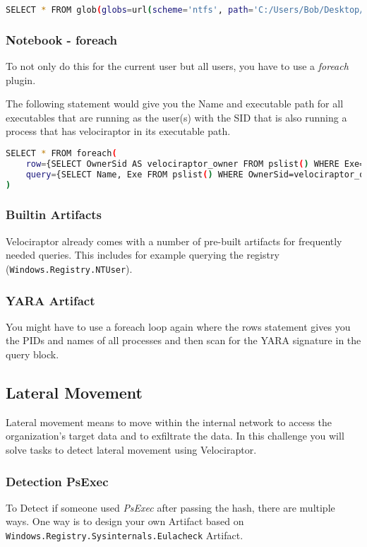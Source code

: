 \begin{lstlisting}[language=bash]
    SELECT * FROM glob(globs=url(scheme='ntfs', path='C:/Users/Bob/Desktop/images.zip', fragment='/**/*.jpg').String, accessor='zip')
\end{lstlisting}

\subsubsection{Notebook - foreach}
To not only do this for the current user but all users, you have to use a \textit{foreach} plugin.

The following statement would give you the Name and executable path for all executables that are running as the user(s) with the SID that is also running a process that has velociraptor in its executable path.

\begin{lstlisting}[language=bash]
    SELECT * FROM foreach(
    row={SELECT OwnerSid AS velociraptor_owner FROM pslist() WHERE Exe=~'velociraptor'},
    query={SELECT Name, Exe FROM pslist() WHERE OwnerSid=velociraptor_owner}
)
\end{lstlisting}

\subsubsection{Builtin Artifacts}
Velociraptor already comes with a number of pre-built artifacts for frequently needed queries.
This includes for example querying the registry (\lstinline|Windows.Registry.NTUser|).

\subsubsection{YARA Artifact}
You might have to use a foreach loop again where the rows statement gives you the PIDs and names of all processes and then scan for the YARA signature in the query block.



\subsection{Lateral Movement}
Lateral movement means to move within the internal network to access the organization's target data and to exfiltrate the data. In this challenge you will solve tasks to detect lateral movement using Velociraptor.

\subsubsection{Detection PsExec}
To Detect if someone used \textit{PsExec} after passing the hash, there are multiple ways. One way is to design your own Artifact based on \lstinline|Windows.Registry.Sysinternals.Eulacheck| Artifact.

